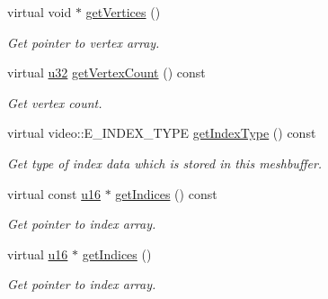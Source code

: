 \begin{DoxyCompactItemize}
\mbox{\label{structirr_1_1scene_1_1SSkinMeshBuffer_af9671765c9d6be2b6d99878e1bdb1b9d}} 
virtual void $\ast$ \hyperlink{structirr_1_1scene_1_1SSkinMeshBuffer_af9671765c9d6be2b6d99878e1bdb1b9d}{get\+Vertices} ()
\begin{DoxyCompactList}\small\item\em Get pointer to vertex array. \end{DoxyCompactList}\item 
\mbox{\label{structirr_1_1scene_1_1SSkinMeshBuffer_a0420d14f4a4317192aa3423c0634d8d8}} 
virtual \hyperlink{namespaceirr_a0416a53257075833e7002efd0a18e804}{u32} \hyperlink{structirr_1_1scene_1_1SSkinMeshBuffer_a0420d14f4a4317192aa3423c0634d8d8}{get\+Vertex\+Count} () const
\begin{DoxyCompactList}\small\item\em Get vertex count. \end{DoxyCompactList}\item 
virtual video\+::\+E\+\_\+\+I\+N\+D\+E\+X\+\_\+\+T\+Y\+PE \hyperlink{structirr_1_1scene_1_1SSkinMeshBuffer_a0655e2196cb283a164580ada6c34aecf}{get\+Index\+Type} () const
\begin{DoxyCompactList}\small\item\em Get type of index data which is stored in this meshbuffer. \end{DoxyCompactList}\item 
\mbox{\label{structirr_1_1scene_1_1SSkinMeshBuffer_ac5f16b3fca6454afe01939a2c1e23d08}} 
virtual const \hyperlink{namespaceirr_ae9f8ec82692ad3b83c21f555bfa70bcc}{u16} $\ast$ \hyperlink{structirr_1_1scene_1_1SSkinMeshBuffer_ac5f16b3fca6454afe01939a2c1e23d08}{get\+Indices} () const
\begin{DoxyCompactList}\small\item\em Get pointer to index array. \end{DoxyCompactList}\item 
\mbox{\label{structirr_1_1scene_1_1SSkinMeshBuffer_ada6af60ed1545fd0b3372ddbb71ada5e}} 
virtual \hyperlink{namespaceirr_ae9f8ec82692ad3b83c21f555bfa70bcc}{u16} $\ast$ \hyperlink{structirr_1_1scene_1_1SSkinMeshBuffer_ada6af60ed1545fd0b3372ddbb71ada5e}{get\+Indices} ()
\begin{DoxyCompactList}\small\item\em Get pointer to index array. \end{DoxyCompactList}\item 

\end{DoxyCompactItemize}
